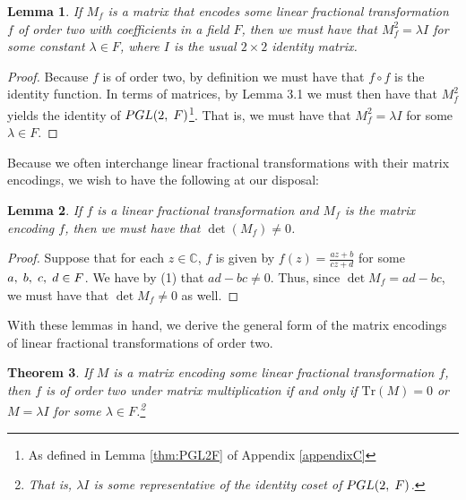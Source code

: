 \documentclass[12pt]{article}
\newcommand{\C}{\mathbb{C}}
\newcommand{\ttc}{, \hspace{1mm}}
\newcommand{\Tr}{\text{Tr}}
\theoremstyle{plain}
\newtheorem{theorem}{Theorem}[section]
\newtheorem{lemma}[theorem]{Lemma}
\theoremstyle{definition}
\begin{document}
\begin{lemma}
	If $M_f$ is a matrix that encodes some linear fractional transformation $f$ of order two with coefficients in a field $F$, then we must have that $M_f^2 = \lambda I$ for some constant $\lambda \in F$, where $I$ is the usual $2 \times 2$ identity matrix. 
\end{lemma}

\begin{proof}
	Because $f$ is of order two, by definition we must have that $f \circ f$ is the identity function. In terms of matrices, by Lemma 3.1 we must then have that $M_f^2$ yields the identity of $PGL(2\ttc F)$\footnote{As defined in Lemma \ref{thm:PGL2F} of Appendix \ref{appendixC}}. That is, we must have that $M_f^2 = \lambda I$ for some $\lambda \in F$.
\end{proof}

Because we often interchange linear fractional transformations with their matrix encodings, we wish to have the following at our disposal:

\begin{lemma}
	If $f$ is a linear fractional transformation and $M_f$ is the matrix encoding $f$, then we must have that $\det(M_f) \neq 0$.
\end{lemma}

\begin{proof}
	Suppose that for each $z \in \C$, $f$ is given by $f(z) = \frac{az+b}{cz+d}$ for some $a\ttc b\ttc c\ttc d \in F$. We have by (1) that $ad-bc \neq 0$. Thus, since $\det M_f = ad-bc$, we must have that $\det M_f \neq 0$ as well.
\end{proof}

With these lemmas in hand, we derive the general form of the matrix encodings of linear fractional transformations of order two. 

\begin{theorem}
If $M$ is a matrix encoding some linear fractional transformation $f$, then $f$ is of order two under matrix multiplication if and only if $\Tr(M) = 0$ or $M = \lambda I$ for some $\lambda \in F$.\footnote{That is, $\lambda I$ is some representative of the identity coset of $PGL(2\ttc F)$.}
\end{theorem}
\end{document}

